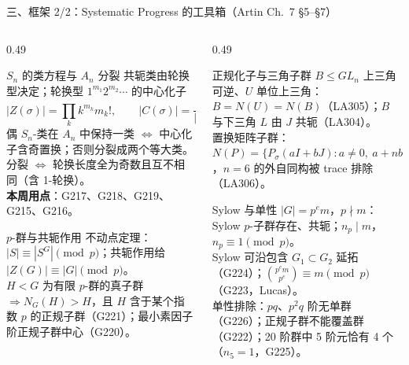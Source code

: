 \documentclass[aspectratio=169,10pt,fontset=none]{ctexbeamer}
\newcommand{\key}[1]{\textcolor{ink}{\bfseries #1}}
\begin{document}
\begin{frame}[t]{三、框架 2/2：Systematic Progress 的工具箱（Artin Ch.~7 \S5--\S7）}
  \label{sec:framework2}
  \begin{columns}[T,onlytextwidth]
    \begin{column}{0.49\textwidth}
      \begin{block}{\footnotesize $S_n$ 的类方程与 $A_n$ 分裂}
        \scriptsize
        共轭类由轮换型决定；轮换型 $1^{m_1}2^{m_2}\cdots$ 的中心化子
        \[ |Z(\sigma)|=\prod_k k^{m_k}m_k!,\qquad |C(\sigma)|=\frac{n!}{|Z(\sigma)|}. \]
        偶 $S_n$-类在 $A_n$ 中保持一类 $\iff$ 中心化子含奇置换；否则分裂成两个等大类。分裂 $\iff$ 轮换长度全为奇数且互不相同（含 1-轮换）。\\
        \key{本周用点}：G217、G218、G219、G215、G216。
      \end{block}
      \begin{block}{\footnotesize $p$-群与共轭作用}
        \scriptsize
        不动点定理：$|S|\equiv|S^G|\pmod p$；共轭作用给 $|Z(G)|\equiv|G|\pmod p$。\\
        $H<G$ 为有限 $p$-群的真子群 $\Rightarrow N_G(H)>H$，且 $H$ 含于某个指数 $p$ 的正规子群（G221）；最小素因子阶正规子群中心（G220）。
      \end{block}
    \end{column}
    \begin{column}{0.49\textwidth}
      \begin{block}{\footnotesize 正规化子与三角子群}
        \scriptsize
        $B\le GL_n$ 上三角可逆、$U$ 单位上三角：$B=N(U)=N(B)$（LA305）；$B$ 与下三角 $L$ 由 $J$ 共轭（LA304）。\\
        置换矩阵子群：$N(P)=\{P_\sigma(aI+bJ):a\ne0,\ a+nb\ne0\}$，$n=6$ 的外自同构被 trace 排除（LA306）。
      \end{block}
      \begin{block}{\footnotesize Sylow 与单性}
        \scriptsize
        $|G|=p^e m$，$p\nmid m$：Sylow $p$-子群存在、共轭；$n_p\mid m$，$n_p\equiv1\pmod p$。\\
        Sylow 可沿包含 $G_1\subset G_2$ 延拓（G224）；$\binom{p^e m}{p^e}\equiv m\pmod p$（G223，Lucas）。\\
        单性排除：$pq$、$p^2q$ 阶无单群（G226）；正规子群不能覆盖群（G222）；20 阶群中 5 阶元恰有 4 个（$n_5=1$，G225）。
      \end{block}
    \end{column}
  \end{columns}
\end{frame}
\end{document}
